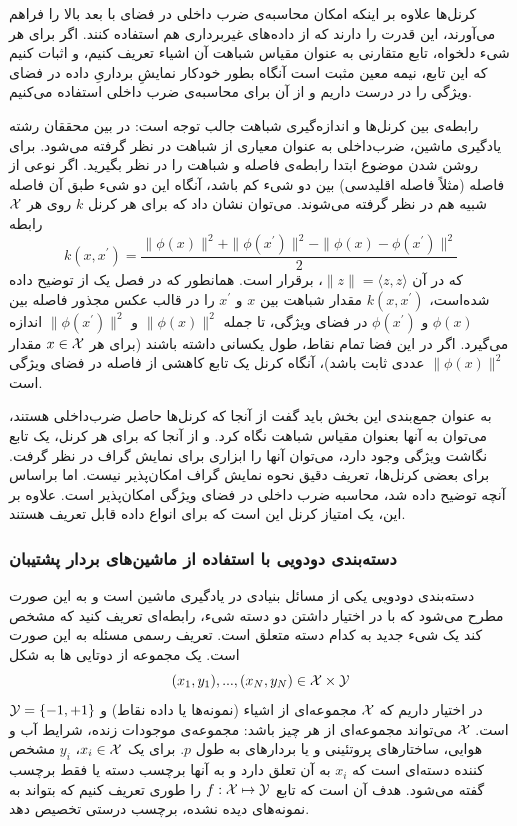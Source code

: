 کرنل‌ها علاوه بر اینکه امکان محاسبه‌ی ضرب داخلی در فضای با بعد بالا را فراهم می‌آورند، این قدرت را دارند که از داده‌های غیربرداری هم استفاده کنند. اگر برای هر شیء دلخواه، تابع متقارنی به عنوان مقیاس شباهت آن اشیاء تعریف کنیم، و اثبات کنیم که این تابع، نیمه معین مثبت است آنگاه بطور خودکار نمایشِ برداریِ داده در فضای ویژگی را در درست داریم و از آن برای محاسبه‌ی ضرب داخلی استفاده می‌کنیم.

رابطه‌ی بین کرنل‌ها و اندازه‌گیری شباهت جالب توجه است: در بین محققان رشته یادگیری ماشین، ضرب‌داخلی به عنوان معیاری از شباهت در نظر گرفته می‌شود. برای روشن شدن موضوع ابتدا رابطه‌ی فاصله و شباهت را در نظر بگیرید. اگر نوعی از فاصله (مثلاً فاصله اقلیدسی) بین دو شیء کم باشد، آنگاه این دو شیء طبق آن فاصله شبیه هم در نظر گرفته می‌شوند. می‌توان نشان داد که برای هر کرنل $k$ روی هر $\mathcal{X}$ رابطه
\begin{equation*}
k(x,x^\prime) = \dfrac{\|\phi(x)\|^2 + \|\phi(x^\prime)\|^2 - \|\phi(x) - \phi(x^\prime)\|^2}{2}
\end{equation*}
که در آن $\|z\| = \langle{z,z}\rangle$، برقرار است. همانطور که در فصل یک از  توضیح داده شده‌است، $k(x,x^\prime)$ مقدار شباهت بین $x$ و $x^\prime$ را در قالب عکس مجذور فاصله بین $\phi(x)$ و $\phi(x^\prime)$ در فضای ویژگی، تا جمله 
$\|\phi(x)\|^2$ و
$\|\phi(x^\prime)\|^2$
 اندازه می‌گیرد. اگر در این فضا تمام نقاط، طول یکسانی داشته باشند (برای هر $x \in \mathcal{X}$ مقدار $\|\phi(x)\|^2$ عددی ثابت باشد)، آنگاه کرنل یک تابع کاهشی از فاصله در فضای ویژگی است.

به عنوان جمع‌بندی این بخش باید گفت از آنجا که کرنل‌ها حاصل ضرب‌داخلی هستند، می‌توان به آنها بعنوان مقیاس شباهت نگاه کرد. و از آنجا که برای هر کرنل، یک تابع نگاشت ویژگی وجود دارد، می‌توان آنها را ابزاری برای نمایش گراف در نظر گرفت. برای بعضی کرنل‌ها، تعریف دقیق نحوه نمایش گراف امکان‌پذیر نیست. اما براساس آنچه توضیح داده شد، محاسبه ضرب داخلی در فضای ویژگی امکان‌پذیر است. علاوه بر این، یک امتیاز کرنل این است که برای انواع داده قابل تعریف هستند.

\subsubsection{دسته‌بندی دودویی با استفاده از ماشین‌های بردار پشتیبان}
دسته‌بندی دودویی یکی از مسائل بنیادی در یادگیری ماشین است و به این صورت مطرح می‌شود که با در اختیار داشتن دو دسته شیء، رابطه‌ای تعریف کنید که مشخص کند یک شیء‌ جدید به کدام دسته متعلق است. تعریف رسمی مسئله به این صورت است. یک مجموعه از دوتایی ها به شکل
\begin{equation*}
(x_1,y_1),...,(x_N,y_N) \in \mathcal{X} \times \mathcal{Y}
\end{equation*}
در اختیار داریم که $\mathcal{X}$ مجموعه‌ای از اشیاء (نمونه‌ها یا داده نقاط) و $\mathcal{Y} = \left\lbrace-1,+1 \right\rbrace$ است. $\mathcal{X}$ می‌تواند مجموعه‌ای از هر چیز باشد: مجموعه‌ی موجودات زنده، شرایط آب و هوایی، ساختارهای پروتئینی و یا بردارهای به طول $p$. برای یک $x_i \in \mathcal{X}$، $y_i$ مشخص کننده دسته‌ای است که $x_i$ به آن تعلق دارد و به آنها برچسب دسته یا فقط برچسب گفته می‌شود. هدف آن است که تابع $f: \mathcal{X} \mapsto \mathcal{Y}$ را طوری تعریف کنیم که بتواند به نمونه‌های دیده نشده، برچسب درستی تخصیص دهد.

